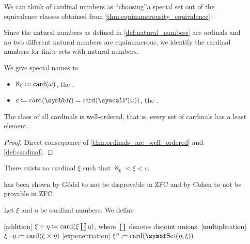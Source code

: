 \begin{remark}\label{remark:cardinals}
  We can think of cardinal numbers as \enquote{choosing}\AOC a special set out of the equivalence classes obtained from \cref{thm:equinumerousity_equivalence}.

  Since the natural numbers as defined in \cref{def:natural_numbers} are ordinals and no two different natural numbers are equinumerous, we identify the cardinal numbers for finite sets with natural numbers.

  We give special names to
  \begin{itemize}
    \item \( \aleph_0 \coloneqq \operatorname{card}(\omega) \), the .
    \item \( c \coloneqq \Card(\BR) = \Card(\Power(\omega)) \), the .
  \end{itemize}
\end{remark}

\begin{proposition}\label{thm:cardinals_well_ordered}
  The class of all cardinals is well-ordered, that is, every set of cardinals has a least element.
\end{proposition}
\begin{proof}
  Direct consequence of \cref{thm:ordinals_are_well_ordered} and \cref{def:cardinal}.
\end{proof}

\begin{hypothesis}\label{hyp:continuum_hypothesis}\cite[165]{Enderton1977}
  There exists no cardinal \( \xi \) such that \( \aleph_0 < \xi < c \).
\end{hypothesis}

\begin{remark}\label{remark:continuum_hypothesis}\cite[165]{Enderton1977}
   has been shown by G\"odel to not be disprovable in ZFC and by Cohen to not be provable in ZFC.
\end{remark}

\begin{definition}\label{def:cardinal_arithmetic}
  Let \( \xi \) and \( \eta \) be cardinal numbers. We define
  \begin{description}
    [addition] \( \xi + \eta \coloneqq \operatorname{card}(\xi \coprod \eta) \), where \( \coprod \) denotes disjoint unions.
    [multiplication] \( \xi \cdot \eta \coloneqq \operatorname{card}(\xi \times \eta) \)
    [exponentiation] \( \xi^\eta \coloneqq \Card(\Cat{Set}(\eta, \xi)) \)
  \end{description}
\end{definition}
